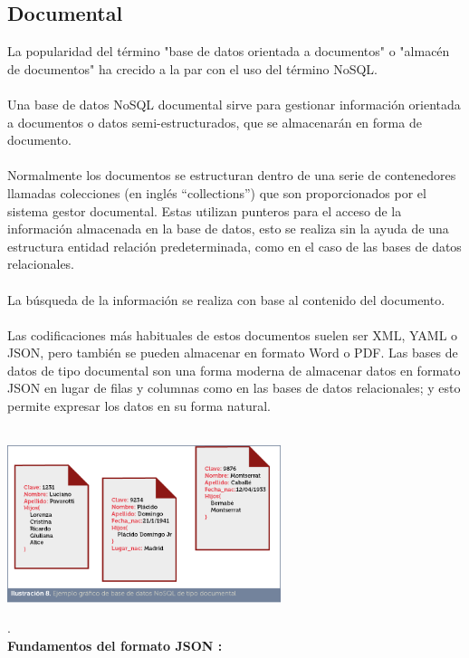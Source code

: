 \documentclass[%
 reprint,
 amsmath,amssymb,
 aps,
]{revtex4-1}
\begin{document}
\subsection{Documental}
 La popularidad del término "base de datos orientada a documentos" o "almacén de documentos" ha crecido a la par con el uso del término NoSQL.\\
\\ Una base de datos NoSQL documental sirve para gestionar información orientada a documentos o datos semi-estructurados, que se almacenarán en forma de documento.\cite{tesis}
\\\\Normalmente los documentos se estructuran dentro de una serie de contenedores llamadas colecciones (en inglés “collections”) que son proporcionados por el sistema gestor documental. Estas utilizan punteros para el acceso de la información almacenada en la base de datos, esto se realiza sin la ayuda de una estructura entidad relación predeterminada, como en el caso de las bases de datos relacionales.\\\\
La búsqueda de la información se realiza con base al contenido del documento. \\\\
Las codificaciones más habituales de estos documentos suelen ser XML, YAML o JSON, pero también se pueden almacenar en formato Word o PDF. \cite{proyecto} Las bases de datos de tipo documental son una forma moderna de almacenar datos en formato JSON en lugar de filas y columnas como en las bases de datos relacionales; y esto permite expresar los datos en su forma natural. \\\\
\begin{center}
	\includegraphics[width=8cm]{./Imagenes/documental1}
\end{center}	
.\\
\textbf{Fundamentos del formato JSON :}
\end{document}
